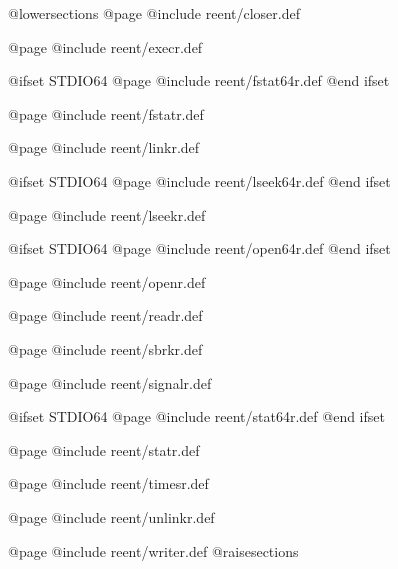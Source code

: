 @lowersections
@page
@include reent/closer.def

@page
@include reent/execr.def

@ifset STDIO64
@page
@include reent/fstat64r.def
@end ifset

@page
@include reent/fstatr.def

@page
@include reent/linkr.def

@ifset STDIO64
@page
@include reent/lseek64r.def
@end ifset

@page
@include reent/lseekr.def

@ifset STDIO64
@page
@include reent/open64r.def
@end ifset

@page
@include reent/openr.def

@page
@include reent/readr.def

@page
@include reent/sbrkr.def

@page
@include reent/signalr.def

@ifset STDIO64
@page
@include reent/stat64r.def
@end ifset

@page
@include reent/statr.def

@page
@include reent/timesr.def

@page
@include reent/unlinkr.def

@page
@include reent/writer.def
@raisesections
